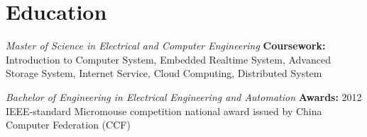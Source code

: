 \documentclass{yijiem}
\begin{document}
\section{Education}
    \begin{spacing}{1.1}
    \textit{\small Master of Science in Electrical and Computer Engineering}\newline
    \textbf{Coursework:} Introduction to Computer System, Embedded Realtime System, Advanced Storage System, Internet Service, Cloud Computing, Distributed System
    \end{spacing}
    \begin{spacing}{1.1}
    \textit{\small Bachelor of Engineering in Electrical Engineering and Automation}\newline
    \textbf{Awards:} 2012 IEEE-standard Micromouse competition national award issued by China Computer Federation (CCF)
    \end{spacing}
\end{document}
